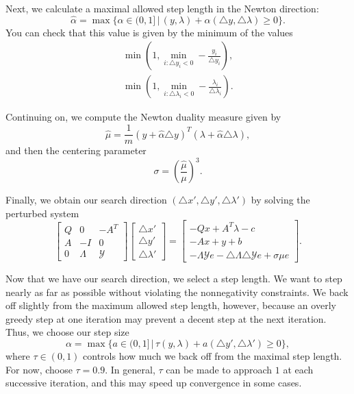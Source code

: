Next, we calculate a maximal allowed step length in the Newton direction:
\[
\hat{\alpha} = \max \{\alpha \in (0,1] \, | \, (y,\lambda) + \alpha(\triangle y, \triangle \lambda) \geq 0\}.
\]
You can check that this value is given by the minimum of the values
\begin{align*}
\min\left(1, \min_{i : \triangle y_i < 0} - \frac{y_i}{\triangle y_i}\right),\\
\min\left(1, \min_{i : \triangle \lambda_i < 0} -\frac{\lambda_i}{\triangle \lambda_i}\right).
\end{align*}

Continuing on, we compute the Newton duality measure given by
\[
\hat{\mu} = \frac{1}{m}(y + \hat{\alpha}\triangle y)^T(\lambda + \hat{\alpha}\triangle \lambda),
\]
and then the centering parameter
\[
\sigma = \left(\frac{\hat{\mu}}{\mu}\right)^3.
\]

Finally, we obtain our search direction $(\triangle x', \triangle y', \triangle \lambda')$ by solving the perturbed
system
\begin{equation}
\begin{bmatrix}
Q & 0 & -A^T\\
A & -I & 0\\
0 & \Lambda & \mathcal{Y}
\end{bmatrix}
\begin{bmatrix}
\triangle x'\\
\triangle y'\\
\triangle \lambda'
\end{bmatrix}
=
\begin{bmatrix}
-Qx + A^T\lambda - c\\
-Ax + y + b\\
-\Lambda\mathcal{Y}e - \triangle \Lambda\triangle\mathcal{Y}e + \sigma\mu e
\end{bmatrix}.
\label{eq:perturbed}
\end{equation}

Now that we have our search direction, we select a step length. We want to step nearly as far as possible
without violating the nonnegativity constraints. We back off slightly from the maximum allowed step length, however,
because an overly greedy step at one iteration may prevent a decent step at the next iteration. Thus,
we choose our step size
\[
\alpha = \max\{a \in (0,1] \, | \, \tau(y,\lambda) +a(\triangle y', \triangle \lambda') \geq 0\},
\]
where $\tau \in (0,1)$ controls how much we back off from the maximal step length. For now, choose $\tau = 0.9$.
In general, $\tau$ can be made to approach $1$ at each successive iteration, and this may speed up convergence in some cases.

